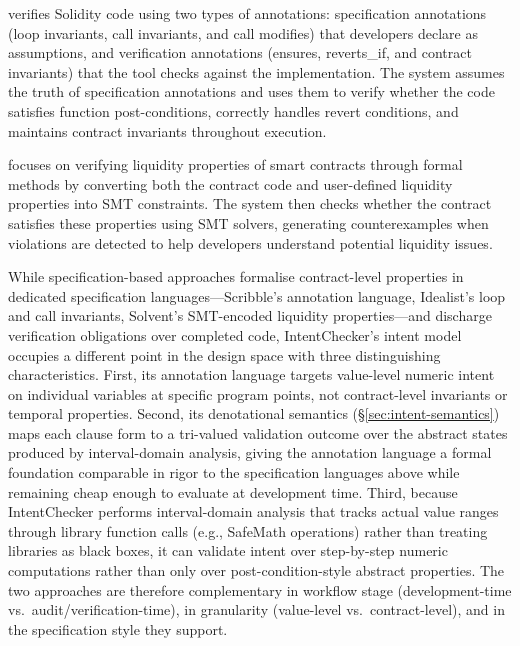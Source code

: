 \documentclass[pdflatex,sn-basic]{sn-jnl}%
\theoremstyle{thmstyleone}%
\theoremstyle{thmstyletwo}%
\theoremstyle{thmstylethree}%
\begin{document}
\citep{idealist} verifies Solidity code using two types of annotations: specification annotations (loop invariants, call invariants, and call modifies) that developers declare as assumptions,
and verification annotations (ensures, reverts\_if, and contract invariants) that the tool checks against the implementation.
The system assumes the truth of specification annotations and uses them to verify whether the code satisfies function post-conditions,
correctly handles revert conditions, and maintains contract invariants throughout execution.

\citep{solvent} focuses on verifying liquidity properties of smart contracts through formal methods
by converting both the contract code and user-defined liquidity properties into SMT constraints.
The system then checks whether the contract satisfies these properties using SMT solvers,
generating counterexamples when violations are detected to help developers understand potential liquidity issues.


While specification-based approaches formalise contract-level properties in dedicated specification languages---Scribble's annotation language, Idealist's loop and call invariants, Solvent's SMT-encoded liquidity properties---and discharge verification obligations over completed code, IntentChecker's intent model occupies a different point in the design space with three distinguishing characteristics.
First, its annotation language targets value-level numeric intent on individual variables at specific program points, not contract-level invariants or temporal properties.
Second, its denotational semantics (§\ref{sec:intent-semantics}) maps each clause form to a tri-valued validation outcome over the abstract states produced by interval-domain analysis, giving the annotation language a formal foundation comparable in rigor to the specification languages above while remaining cheap enough to evaluate at development time.
Third, because IntentChecker performs interval-domain analysis that tracks actual value ranges through library function calls (e.g., SafeMath operations) rather than treating libraries as black boxes, it can validate intent over step-by-step numeric computations rather than only over post-condition-style abstract properties.
The two approaches are therefore complementary in workflow stage (development-time vs.\ audit/verification-time), in granularity (value-level vs.\ contract-level), and in the specification style they support.
\end{document}
